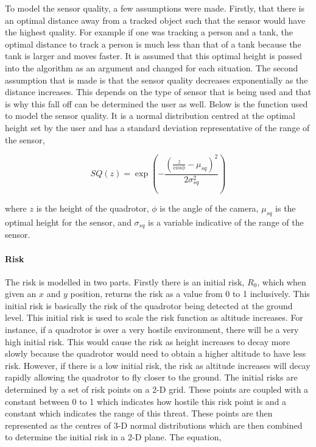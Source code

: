 \documentclass[12pt]{article}
\begin{document}
To model the sensor quality, a few assumptions were made. Firstly, that there
is an optimal distance away from a tracked object such that the sensor would
have the highest quality. For example if one was tracking a person and a tank,
the optimal distance to track a person is much less than that of a tank because
the tank is larger and moves faster. It is assumed that this optimal height is
passed into the algorithm as an argument and changed for each situation. The
second assumption that is made is that the sensor quality decreases
exponentially as the distance increases. This depends on the type of sensor
that is being used and that is why this fall off can be determined the user as
well. Below is the function used to model the sensor quality. It is a normal
distribution centred at the optimal height set by the user and has a standard
deviation representative of the range of the sensor,

$$ SQ(z) = \exp{(-\frac{(\frac{z}{ cos{\phi}} -
\mu_{sq})^2}{2\sigma_{sq}^2})} $$

where $z$ is the height of the quadrotor, $\phi$ is the angle of the camera,
$\mu_{sq}$ is the optimal height for the sensor, and $\sigma_{sq}$ is a
variable indicative of the range of the sensor.

\paragraph{Risk} 

The risk is modelled in two parts. Firstly there is an initial risk, $R_0$,
which when given an $x$ and $y$ position, returns the risk as a value from 0 to
1 inclusively. This initial risk is basically the risk of the quadrotor being
detected at the ground level. This initial risk is used to scale the risk
function as altitude increases. For instance, if a quadrotor is over a very
hostile environment, there will be a very high initial risk. This would cause
the risk as height increases to decay more slowly because the quadrotor would
need to obtain a higher altitude to have less risk. However, if there is a low
initial risk, the risk as altitude increases will decay rapidly allowing the
quadrotor to fly closer to the ground. The initial risks are determined by a
set of risk points on a 2-D grid. These points are coupled with a constant
between 0 to 1 which indicates how hostile this risk point is and a constant
which indicates the range of this threat. These points are then represented as
the centres of 3-D normal distributions which are then combined to determine
the initial risk in a 2-D plane. The equation,
\end{document}
